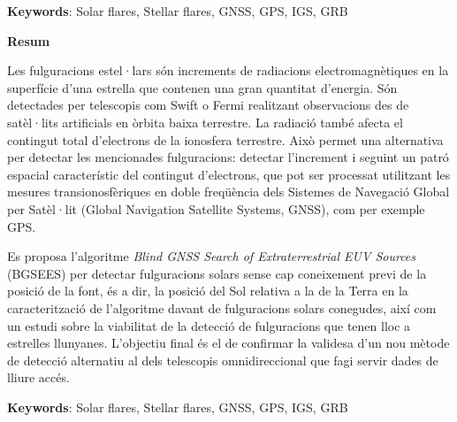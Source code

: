 \textbf{Keywords}: Solar flares, Stellar flares, GNSS, GPS, IGS, GRB

\clearpage
\thispagestyle{empty}
\begin{center}
	\Large
	\textbf{Resum}
\end{center}
Les fulguracions estel·lars són increments de radiacions electromagnètiques en la superfície d'una estrella que contenen una gran quantitat d'energia. Són detectades per telescopis com Swift o Fermi realitzant observacions des de satèl·lits artificials en òrbita baixa terrestre. La radiació també afecta el contingut total d'electrons de la ionosfera terrestre. Això permet una alternativa per detectar les mencionades fulguracions: detectar l'increment i seguint un patró espacial característic del contingut d'electrons, que pot ser processat utilitzant les mesures transionosfèriques en doble freqüència dels Sistemes de Navegació Global per Satèl·lit (Global Navigation Satellite Systems, GNSS), com per exemple GPS.

Es proposa l'algoritme \textit{Blind GNSS Search of Extraterrestrial EUV Sources} (BGSEES) per detectar fulguracions solars sense cap coneixement previ de la posició de la font, és a dir, la posició del Sol relativa a la de la Terra en la caracterització de l'algoritme davant de fulguracions solars conegudes, així com un estudi sobre la viabilitat de la detecció de fulguracions que tenen lloc a estrelles llunyanes. L'objectiu final és el de confirmar la validesa d'un nou mètode de detecció alternatiu al dels telescopis omnidireccional que fagi servir dades de lliure accés.

\textbf{Keywords}: Solar flares, Stellar flares, GNSS, GPS, IGS, GRB
